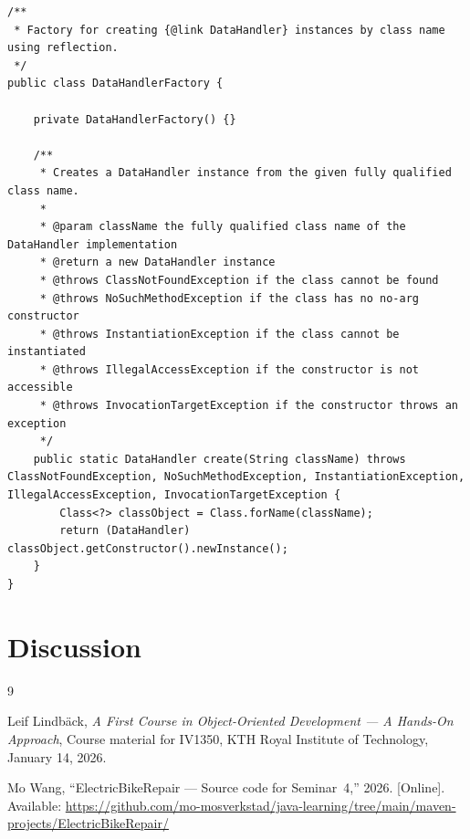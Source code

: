 \documentclass[a4paper]{scrartcl}
\begin{document}
\begin{lstlisting}[style=javastyle, caption={DataHandlerFactory that instantiates data handler object dynamically}]
/**
 * Factory for creating {@link DataHandler} instances by class name using reflection.
 */
public class DataHandlerFactory {

    private DataHandlerFactory() {}

    /**
     * Creates a DataHandler instance from the given fully qualified class name.
     *
     * @param className the fully qualified class name of the DataHandler implementation
     * @return a new DataHandler instance
     * @throws ClassNotFoundException if the class cannot be found
     * @throws NoSuchMethodException if the class has no no-arg constructor
     * @throws InstantiationException if the class cannot be instantiated
     * @throws IllegalAccessException if the constructor is not accessible
     * @throws InvocationTargetException if the constructor throws an exception
     */
    public static DataHandler create(String className) throws ClassNotFoundException, NoSuchMethodException, InstantiationException, IllegalAccessException, InvocationTargetException {
        Class<?> classObject = Class.forName(className);
        return (DataHandler) classObject.getConstructor().newInstance();
    }
}
\end{lstlisting}

\section{Discussion}

\begin{thebibliography}{9}

Leif Lindbäck,
\textit{A First Course in Object-Oriented Development --- A Hands-On Approach},
Course material for IV1350,
KTH Royal Institute of Technology,
January 14, 2026.

Mo Wang,
``ElectricBikeRepair --- Source code for Seminar~4,''
2026.
[Online]. Available: \url{https://github.com/mo-mosverkstad/java-learning/tree/main/maven-projects/ElectricBikeRepair/}

\end{thebibliography}
\end{document}

